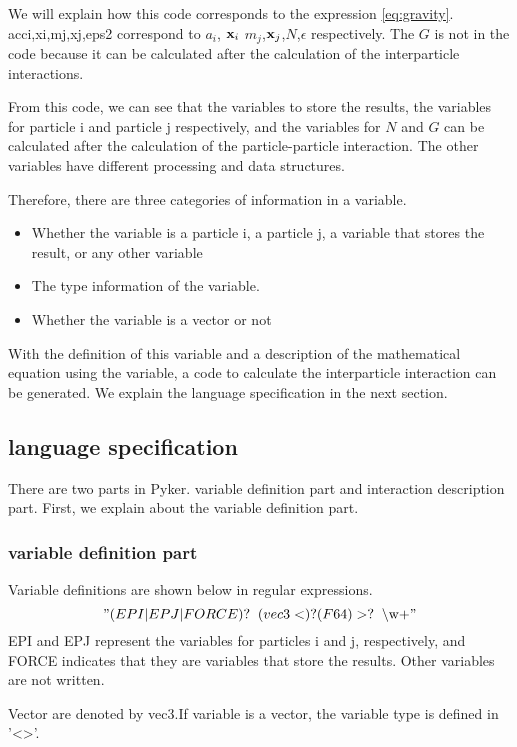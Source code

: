 \documentclass[ams]{article}
\begin{document}
We will explain how this code corresponds to the expression 
\eqref{eq:gravity}.
acci,xi,mj,xj,eps2 correspond to
 $a_i$, $\vb{x}_i$ $m_j$,$\vb{x}_j$,$N$,$\epsilon$ respectively.
The $G$ is not in the code because it can be calculated after the 
calculation of the interparticle interactions.


 From this code, we can see that the variables to store the results, 
the variables for particle i and particle j respectively, and the 
variables for $N$ and $G$ can be calculated after the calculation of 
the particle-particle interaction. The other variables have different 
processing and data structures.


 Therefore, there are three categories of information in a variable.
\begin{itemize}
  \item Whether the variable is a particle i, a particle j, a
  variable that stores the result, or any other variable
  \item The type information of the variable.
  \item Whether the variable is a vector or not
\end{itemize}

 With the definition of this variable and a description of the
mathematical equation using the variable, a code to calculate the
interparticle interaction can be generated.
We explain the language specification in the next section.

\subsection{language specification}
There are two parts in Pyker. variable definition part and 
interaction description part.
First, we explain about the variable definition part.

\subsubsection{variable definition part}
Variable definitions are shown below in regular expressions.
\["(EPI|EPJ|FORCE)?\:\text{ } (vec3<)?(F64)>?\:\text{ } \text{\textbackslash w+}"\]
EPI and EPJ represent the variables for particles i and j, 
respectively, and FORCE indicates that they are variables that
 store the results.   Other variables are not written.


 Vector are denoted by vec3.If variable is a vector, the variable type
 is defined in '<>'.
\end{document}
